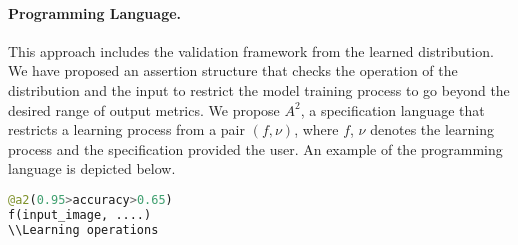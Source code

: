 \paragraph{Programming Language.} This approach includes the validation framework from the learned distribution. We have proposed an assertion structure that checks the operation of the distribution and the input to restrict the model training process to go beyond the desired range of output metrics. We propose $A^2$, a specification language that restricts a learning process from a pair $(f,\nu)$, where $f$, $\nu$ denotes the learning process and the specification provided the user. An example of the programming language is depicted below.
\begin{lstlisting}[language=Python, caption=Accountable specification language]
@a2(0.95>accuracy>0.65)
f(input_image, ....)
\\Learning operations
\end{lstlisting}